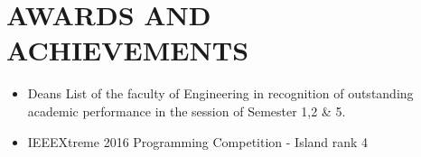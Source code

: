 \documentclass[11pt,a4paper,roman]{moderncv}        %
\newcommand{\divider}{\textcolor{body!30}{\hdashrule{\linewidth}{0.6pt}{0.5ex}}\medskip}
\begin{document}

\section{AWARDS AND ACHIEVEMENTS}
\begin{minipage}{\maincolumnwidth}%
	\small{
    	\begin{itemize}
          \item Deans List of the faculty of Engineering in recognition of outstanding academic performance in the session of Semester 1,2 \& 5.
          \vspace{1mm}
          \item IEEEXtreme 2016 Programming Competition - Island rank 4
          \vspace{1mm}
		\end{itemize}}%
\end{minipage}%





    
\end{document}
